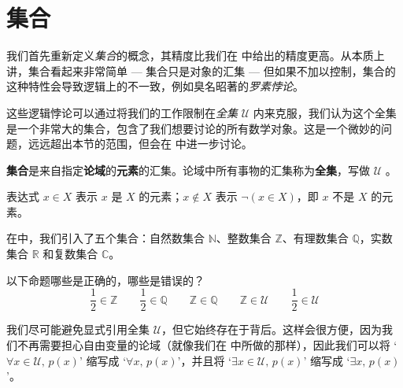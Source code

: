 \section{集合}

我们首先重新定义\textit{集合}的概念，其精度比我们在  中给出的精度更高。从本质上讲，集合看起来非常简单 --- 集合只是对象的汇集 --- 但如果不加以控制，集合的这种特性会导致逻辑上的不一致，例如臭名昭著的\textit{罗素悖论}。

这些逻辑悖论可以通过将我们的工作限制在\textit{全集} $\mathcal{U}$ 内来克服，我们认为这个全集是一个非常大的集合，包含了我们想要讨论的所有数学对象。这是一个微妙的问题，远远超出本节的范围，但会在  中进一步讨论。

\begin{definition}
\label{defSet}
\textbf{集合}是来自指定\textbf{论域}的\textbf{元素}的汇集。论域中所有事物的汇集称为\textbf{全集}，写做 $\mathcal{U}$ 。

表达式 $x \in X$  表示 $x$ 是 $X$ 的元素；$x \not \in X$  表示 $\neg (x \in X)$，即 $x$ 不是 $X$ 的元素。
\end{definition}

\begin{example}
在中，我们引入了五个集合：自然数集合 $\mathbb{N}$、整数集合 $\mathbb{Z}$、有理数集合 $\mathbb{Q}$，实数集合 $\mathbb{R}$ 和复数集合 $\mathbb{C}$。
\end{example}

\begin{exercise}
以下命题哪些是正确的，哪些是错误的？
\[ \frac{1}{2} \in \mathbb{Z} \qquad \frac{1}{2} \in \mathbb{Q} \qquad \mathbb{Z} \in \mathbb{Q} \qquad \mathbb{Z} \in \mathcal{U} \qquad \frac{1}{2} \in \mathcal{U} \]
\end{exercise}

我们尽可能避免显式引用全集 $\mathcal{U}$，但它始终存在于背后。这样会很方便，因为我们不再需要担心自由变量的论域（就像我们在  中所做的那样），因此我们可以将 `$\forall x \in \mathcal{U},\, p(x)$' 缩写成 `$\forall x,\, p(x)$'，并且将 `$\exists x \in \mathcal{U},\, p(x)$' 缩写成 `$\exists x ,\,p(x)$'。

